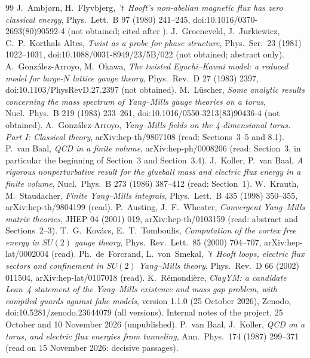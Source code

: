 \documentclass[11pt,a4paper]{article}
\theoremstyle{plain}
\theoremstyle{definition}
\theoremstyle{remark}
\numberwithin{equation}{section}
\begin{document}
{\begin{thebibliography}{99}
 J.~Ambj{\o}rn, H.~Flyvbjerg, \emph{'t~Hooft's non-abelian magnetic flux has zero classical energy}, Phys.\ Lett.\ B 97 (1980) 241--245, doi:10.1016/0370-2693(80)90592-4 (not obtained; cited after \cite{vB82}).
 J.~Groeneveld, J.~Jurkiewicz, C.~P.~Korthals Altes, \emph{Twist as a probe for phase structure}, Phys.\ Scr.\ 23 (1981) 1022--1031, doi:10.1088/0031-8949/23/5B/022 (not obtained; abstract only).
 A.~Gonz\'alez-Arroyo, M.~Okawa, \emph{The twisted Eguchi--Kawai model: a reduced model for large-$N$ lattice gauge theory}, Phys.\ Rev.\ D 27 (1983) 2397, doi:10.1103/PhysRevD.27.2397 (not obtained).
 M.~L\"uscher, \emph{Some analytic results concerning the mass spectrum of Yang--Mills gauge theories on a torus}, Nucl.\ Phys.\ B 219 (1983) 233--261, doi:10.1016/0550-3213(83)90436-4 (not obtained).
 A.~Gonz\'alez-Arroyo, \emph{Yang--Mills fields on the 4-dimensional torus. Part I: Classical theory}, arXiv:hep-th/9807108 (read: Sections~3--5 and 8.1).
 P.~van Baal, \emph{QCD in a finite volume}, arXiv:hep-ph/0008206 (read: Section~3, in particular the beginning of Section~3 and Section~3.4).
 J.~Koller, P.~van Baal, \emph{A rigorous nonperturbative result for the glueball mass and electric flux energy in a finite volume}, Nucl.\ Phys.\ B 273 (1986) 387--412 (read: Section~1).
 W.~Krauth, M.~Staudacher, \emph{Finite Yang--Mills integrals}, Phys.\ Lett.\ B 435 (1998) 350--355, arXiv:hep-th/9804199 (read).
 P.~Austing, J.~F.~Wheater, \emph{Convergent Yang--Mills matrix theories}, JHEP 04 (2001) 019, arXiv:hep-th/0103159 (read: abstract and Sections~2--3).
 T.~G.~Kov\'acs, E.~T.~Tomboulis, \emph{Computation of the vortex free energy in $SU(2)$ gauge theory}, Phys.\ Rev.\ Lett.\ 85 (2000) 704--707, arXiv:hep-lat/0002004 (read).
 Ph.~de~Forcrand, L.~von~Smekal, \emph{'t~Hooft loops, electric flux sectors and confinement in $SU(2)$ Yang--Mills theory}, Phys.\ Rev.\ D 66 (2002) 011504, arXiv:hep-lat/0107018 (read).
 K.~R\'emondi\`ere, \emph{ClayYM: a candidate Lean~4 statement of the Yang--Mills existence and mass gap problem, with
compiled guards against fake models}, version 1.1.0 (25 October 2026), Zenodo, doi:10.5281/zenodo.23644079 (all versions).
 Internal notes of the project, 25 October and 10 November 2026 (unpublished).
 P.~van Baal, J.~Koller, \emph{QCD on a torus, and electric flux energies from tunneling}, Ann.\ Phys.\ 174 (1987) 299--371 (read on 15 November 2026: decisive passages).

\end{thebibliography}}
\end{document}
